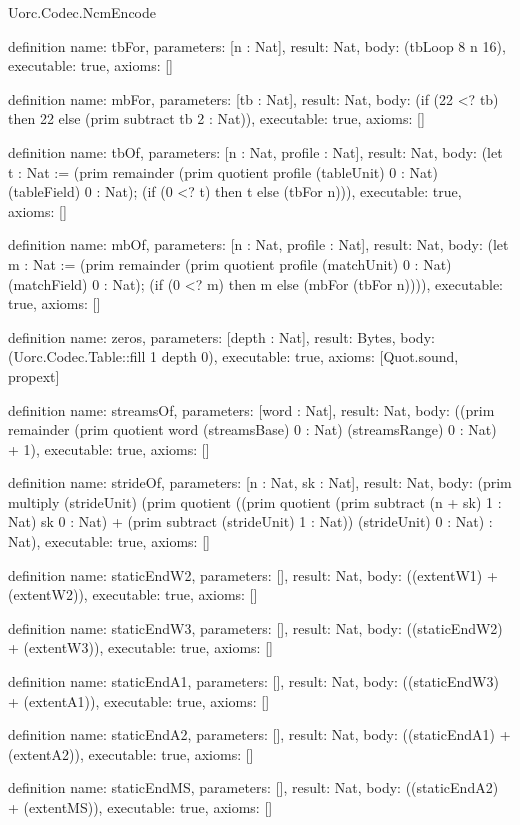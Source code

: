 \begin{lexlean}{Uorc.Codec.NcmEncode}
\begin{semanticmodule}
definition{
  name: tbFor,
  parameters: [n : Nat],
  result: Nat,
  body: (tbLoop 8 n 16),
  executable: true,
  axioms: []
}

definition{
  name: mbFor,
  parameters: [tb : Nat],
  result: Nat,
  body: (if (22 <? tb) then 22 else (prim subtract tb 2 : Nat)),
  executable: true,
  axioms: []
}

definition{
  name: tbOf,
  parameters: [n : Nat, profile : Nat],
  result: Nat,
  body: (let t : Nat := (prim remainder (prim quotient profile (tableUnit) 0 : Nat) (tableField) 0 : Nat); (if (0 <? t) then t else (tbFor n))),
  executable: true,
  axioms: []
}

definition{
  name: mbOf,
  parameters: [n : Nat, profile : Nat],
  result: Nat,
  body: (let m : Nat := (prim remainder (prim quotient profile (matchUnit) 0 : Nat) (matchField) 0 : Nat); (if (0 <? m) then m else (mbFor (tbFor n)))),
  executable: true,
  axioms: []
}

definition{
  name: zeros,
  parameters: [depth : Nat],
  result: Bytes,
  body: (Uorc.Codec.Table::fill 1 depth 0),
  executable: true,
  axioms: [Quot.sound, propext]
}

definition{
  name: streamsOf,
  parameters: [word : Nat],
  result: Nat,
  body: ((prim remainder (prim quotient word (streamsBase) 0 : Nat) (streamsRange) 0 : Nat) + 1),
  executable: true,
  axioms: []
}

definition{
  name: strideOf,
  parameters: [n : Nat, sk : Nat],
  result: Nat,
  body: (prim multiply (strideUnit) (prim quotient ((prim quotient (prim subtract (n + sk) 1 : Nat) sk 0 : Nat) + (prim subtract (strideUnit) 1 : Nat)) (strideUnit) 0 : Nat) : Nat),
  executable: true,
  axioms: []
}

definition{
  name: staticEndW2,
  parameters: [],
  result: Nat,
  body: ((extentW1) + (extentW2)),
  executable: true,
  axioms: []
}

definition{
  name: staticEndW3,
  parameters: [],
  result: Nat,
  body: ((staticEndW2) + (extentW3)),
  executable: true,
  axioms: []
}

definition{
  name: staticEndA1,
  parameters: [],
  result: Nat,
  body: ((staticEndW3) + (extentA1)),
  executable: true,
  axioms: []
}

definition{
  name: staticEndA2,
  parameters: [],
  result: Nat,
  body: ((staticEndA1) + (extentA2)),
  executable: true,
  axioms: []
}

definition{
  name: staticEndMS,
  parameters: [],
  result: Nat,
  body: ((staticEndA2) + (extentMS)),
  executable: true,
  axioms: []
}


\end{semanticmodule}
\end{lexlean}
